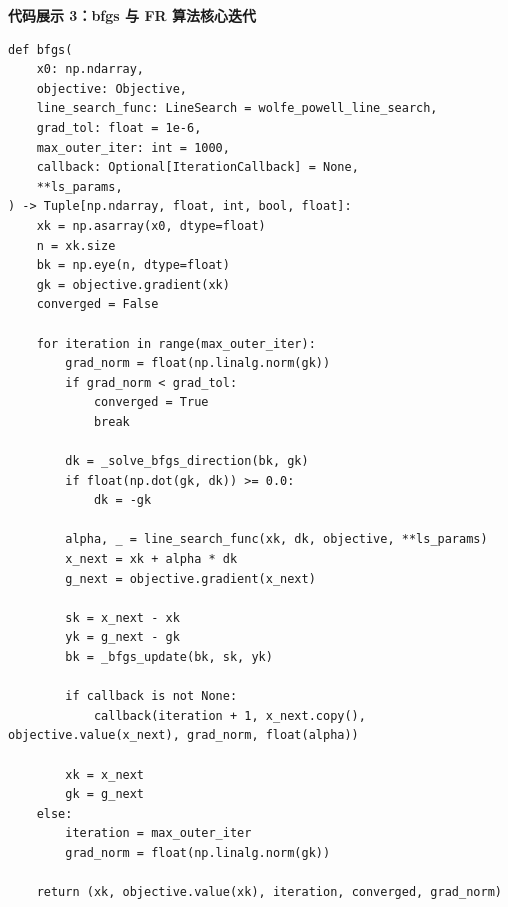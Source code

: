 \documentclass[12pt,a4paper]{ctexart}
\begin{document}
\textbf{代码展示 3：bfgs 与 FR 算法核心迭代}
\begin{lstlisting}[caption={bfgs.py 中 BFGS 主迭代代码},label={lst:bfgs-impl}]
def bfgs(
    x0: np.ndarray,
    objective: Objective,
    line_search_func: LineSearch = wolfe_powell_line_search,
    grad_tol: float = 1e-6,
    max_outer_iter: int = 1000,
    callback: Optional[IterationCallback] = None,
    **ls_params,
) -> Tuple[np.ndarray, float, int, bool, float]:
    xk = np.asarray(x0, dtype=float)
    n = xk.size
    bk = np.eye(n, dtype=float)
    gk = objective.gradient(xk)
    converged = False

    for iteration in range(max_outer_iter):
        grad_norm = float(np.linalg.norm(gk))
        if grad_norm < grad_tol:
            converged = True
            break

        dk = _solve_bfgs_direction(bk, gk)
        if float(np.dot(gk, dk)) >= 0.0:
            dk = -gk

        alpha, _ = line_search_func(xk, dk, objective, **ls_params)
        x_next = xk + alpha * dk
        g_next = objective.gradient(x_next)

        sk = x_next - xk
        yk = g_next - gk
        bk = _bfgs_update(bk, sk, yk)

        if callback is not None:
            callback(iteration + 1, x_next.copy(), objective.value(x_next), grad_norm, float(alpha))

        xk = x_next
        gk = g_next
    else:
        iteration = max_outer_iter
        grad_norm = float(np.linalg.norm(gk))

    return (xk, objective.value(xk), iteration, converged, grad_norm)
\end{lstlisting}
\end{document}
